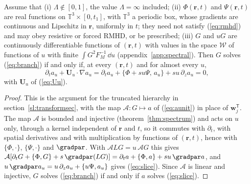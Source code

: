 \begin{theorem}\label{thm:slice}
Assume that (i) $\Lambda\notin[0,1]$, the value $\Lambda=\infty$ included; (ii) $\Phi(\boldsymbol r,t)$ and $\Psi(\boldsymbol r,t)$ are real functions on $\mathbb T^3\times[0,t_1]$, with $\mathbb T^3$ a periodic box, whose gradients are continuous and Lipschitz in $\boldsymbol r$, uniformly in $t$; they need not satisfy (\ref{eq:rmhd}) and may obey resistive or forced RMHD, or be prescribed; (iii) $G$ and $uG$ are continuously differentiable functions of $(\boldsymbol r,t)$ with values in the space $\mathcal W$ of functions of $u$ with finite $\int G^2F_M^{-1}\,\dd u$ (appendix~\ref{app:spectral}). Then $G$ solves (\ref{eq:branch}) if and only if, at every $(\boldsymbol r,t)$ and for almost every $u$,
\begin{equation}\label{eq:slice}
  \partial_ta_u+\boldsymbol U_u\cdot\nabla a_u=\partial_ta_u+\{\Phi+su\Psi,\,a_u\}+su\,\partial_za_u=0,
\end{equation}
with $\boldsymbol U_u$ of (\ref{eq:Uu}).
\end{theorem}

\begin{proof}
This is the argument for the truncated hierarchy in section~\ref{sl:transformsec}, with the map $\mathcal A:G\mapsto a$ of (\ref{eq:aunit}) in place of $\boldsymbol w_j^{\mathsf T}$. The map $\mathcal A$ is bounded and injective (theorem~\ref{thm:spectrum}) and acts on $u$ only, through a kernel independent of $\boldsymbol r$ and $t$, so it commutes with $\partial_t$, with spatial derivatives and with multiplication by functions of $(\boldsymbol r,t)$, hence with $\{\Phi,\cdot\}$, $\{\Psi,\cdot\}$ and $\gradpar$. With $\mathcal ALG=u\,\mathcal AG$ this gives $\mathcal A[\partial_tG+\{\Phi,G\}+s\,\gradpar(LG)]=\partial_ta+\{\Phi,a\}+su\,\gradpar a$, and $u\,\gradpar a_u=u\,\partial_za_u+\{u\Psi,a_u\}$ gives (\ref{eq:slice}). Since $\mathcal A$ is linear and injective, $G$ solves (\ref{eq:branch}) if and only if $a$ solves (\ref{eq:slice}).
\end{proof}

